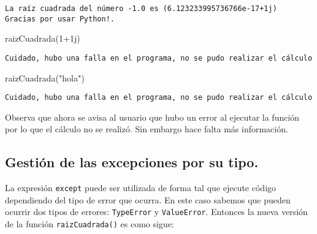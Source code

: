 \documentclass[
  letterpaper,
  DIV=11,
  numbers=noendperiod]{scrreprt}
\newenvironment{Shaded}{\begin{snugshade}}{\end{snugshade}}
\newcommand{\DecValTok}[1]{\textcolor[rgb]{0.68,0.00,0.00}{#1}}
\newcommand{\NormalTok}[1]{\textcolor[rgb]{0.00,0.23,0.31}{#1}}
\newcommand{\OperatorTok}[1]{\textcolor[rgb]{0.37,0.37,0.37}{#1}}
\newcommand{\OtherTok}[1]{\textcolor[rgb]{0.00,0.23,0.31}{#1}}
\newcommand{\StringTok}[1]{\textcolor[rgb]{0.13,0.47,0.30}{#1}}
\begin{document}
\begin{verbatim}
La raíz cuadrada del número -1.0 es (6.123233995736766e-17+1j)
Gracias por usar Python!.
\end{verbatim}

\begin{Shaded}
\begin{Highlighting}[]
\NormalTok{raizCuadrada(}\DecValTok{1}\OperatorTok{+}\OtherTok{1j}\NormalTok{)}
\end{Highlighting}
\end{Shaded}

\begin{verbatim}
Cuidado, hubo una falla en el programa, no se pudo realizar el cálculo
\end{verbatim}

\begin{Shaded}
\begin{Highlighting}[]
\NormalTok{raizCuadrada(}\StringTok{"hola"}\NormalTok{)}
\end{Highlighting}
\end{Shaded}

\begin{verbatim}
Cuidado, hubo una falla en el programa, no se pudo realizar el cálculo
\end{verbatim}

Observa que ahora se avisa al usuario que hubo un error al ejecutar la
función por lo que el cálculo no se realizó. Sin embargo hace falta más
información.

\subsection{Gestión de las excepciones por su
tipo.}\label{gestiuxf3n-de-las-excepciones-por-su-tipo.}

La expresión \texttt{except} puede ser utilizada de forma tal que
ejecute código dependiendo del tipo de error que ocurra. En este caso
sabemos que pueden ocurrir dos tipos de errores: \texttt{TypeError} y
\texttt{ValueError}. Entonces la nueva versión de la función
\texttt{raizCuadrada()} es como sigue:
\end{document}
